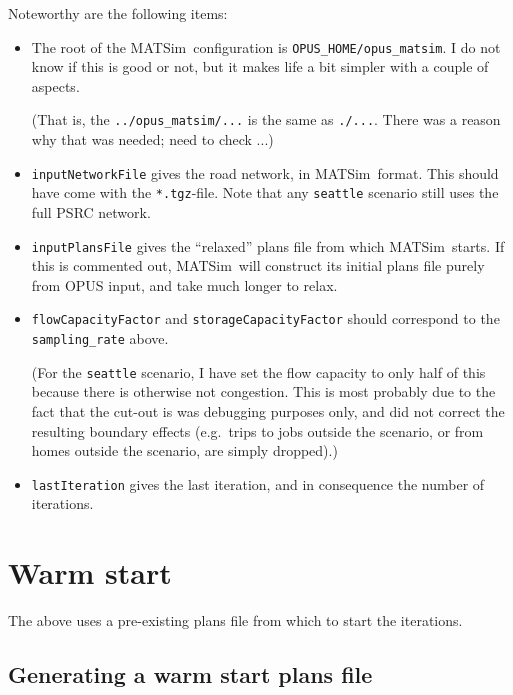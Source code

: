 \documentclass{article}
\def\matsim{MATSim}
\begin{document}
Noteworthy are the following items:
\begin{itemize}

\item The root of the \matsim\ configuration is
\verb$OPUS_HOME/opus_matsim$.  I do not know if this is good or not,
but it makes life a bit simpler with a couple of aspects.  

(That is, the \verb$../opus_matsim/...$ is the same as \verb$./...$.
There was a reason why that was needed; need to check ...)

\item \verb$inputNetworkFile$ gives the road network, in \matsim\
format.  This should have come with the \verb$*.tgz$-file.  Note that
any \verb$seattle$ scenario still uses the full PSRC network.

\item \verb$inputPlansFile$ gives the ``relaxed'' plans file from
which \matsim\ starts.  If this is commented out, \matsim\ will
construct its initial plans file purely from OPUS input, and take much
longer to relax.

\item \verb$flowCapacityFactor$ and \verb$storageCapacityFactor$
should correspond to the \verb$sampling_rate$ above.

(For the {\tt seattle} scenario, I have set the flow capacity to only
half of this because there is otherwise not congestion.  This is most
probably due to the fact that the cut-out is was debugging purposes
only, and did not correct the resulting boundary effects (e.g.\ trips
to jobs outside the scenario, or from homes outside the scenario, are
simply dropped).)

\item \verb$lastIteration$ gives the last iteration, and in
consequence the number of iterations.

\end{itemize}

\section{Warm start}

The above uses a pre-existing plans file from which to start the
iterations.

\subsection{Generating a warm start plans file}
\end{document}
